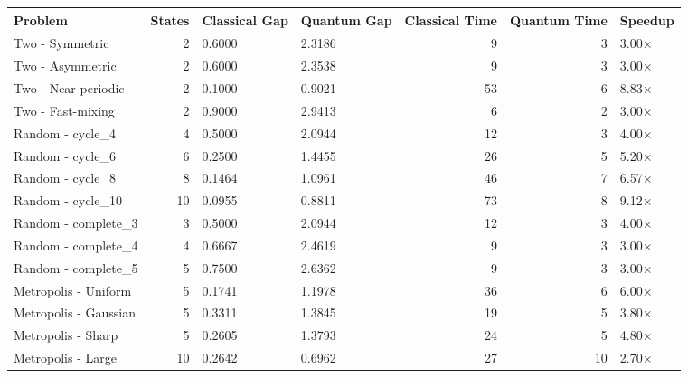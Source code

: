\begin{tabular}{lrllrrl}
\toprule
Problem & States & Classical Gap & Quantum Gap & Classical Time & Quantum Time & Speedup \\
\midrule
Two - Symmetric & 2 & 0.6000 & 2.3186 & 9 & 3 & 3.00× \\
Two - Asymmetric & 2 & 0.6000 & 2.3538 & 9 & 3 & 3.00× \\
Two - Near-periodic & 2 & 0.1000 & 0.9021 & 53 & 6 & 8.83× \\
Two - Fast-mixing & 2 & 0.9000 & 2.9413 & 6 & 2 & 3.00× \\
Random - cycle_4 & 4 & 0.5000 & 2.0944 & 12 & 3 & 4.00× \\
Random - cycle_6 & 6 & 0.2500 & 1.4455 & 26 & 5 & 5.20× \\
Random - cycle_8 & 8 & 0.1464 & 1.0961 & 46 & 7 & 6.57× \\
Random - cycle_10 & 10 & 0.0955 & 0.8811 & 73 & 8 & 9.12× \\
Random - complete_3 & 3 & 0.5000 & 2.0944 & 12 & 3 & 4.00× \\
Random - complete_4 & 4 & 0.6667 & 2.4619 & 9 & 3 & 3.00× \\
Random - complete_5 & 5 & 0.7500 & 2.6362 & 9 & 3 & 3.00× \\
Metropolis - Uniform & 5 & 0.1741 & 1.1978 & 36 & 6 & 6.00× \\
Metropolis - Gaussian & 5 & 0.3311 & 1.3845 & 19 & 5 & 3.80× \\
Metropolis - Sharp & 5 & 0.2605 & 1.3793 & 24 & 5 & 4.80× \\
Metropolis - Large & 10 & 0.2642 & 0.6962 & 27 & 10 & 2.70× \\
\bottomrule
\end{tabular}
